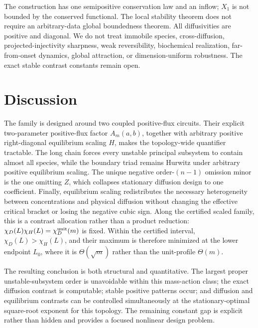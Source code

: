 \documentclass[11pt]{article}
\theoremstyle{definition}
\newcommand{\1}{\mathbf 1}
\begin{document}
The construction has one semipositive conservation law and an inflow; $X_1$
is not bounded by the conserved functional.  The local stability theorem does
not require an arbitrary-data global boundedness theorem.  All diffusivities
are positive and diagonal.  We do not treat immobile species, cross-diffusion,
projected-injectivity sharpness, weak reversibility, biochemical realization,
far-from-onset dynamics, global attraction, or dimension-uniform robustness.
The exact stable contrast constants remain open.

\section{Discussion}

The family is designed around two coupled positive-flux circuits.  Their
explicit two-parameter positive-flux factor $A_m(a,b)$, together with
arbitrary positive right-diagonal equilibrium scaling $H$, makes the
topology-wide quantifier tractable.  The long chain forces every unstable
principal subsystem to contain almost all species, while the boundary triad remains Hurwitz under
arbitrary positive equilibrium scaling.  The unique negative order-$(n-1)$
omission minor is the one omitting $Z$, which collapses stationary diffusion
design to one coefficient.  Finally, equilibrium scaling redistributes the
necessary heterogeneity between concentrations and physical diffusion without
changing the effective critical bracket or losing the negative cubic sign.
Along the certified scaled family, this is a contrast allocation rather than
a product reduction: $\chi_D(L)\chi_H(L)=\chi_D^{\rm unit}(m)$ is fixed.
Within the certified interval, $\chi_D(L)>\chi_H(L)$, and their maximum is
therefore minimized at the lower endpoint $L_0$, where it is
$\Theta(\sqrt m)$ rather than the unit-profile $\Theta(m)$.

The resulting conclusion is both structural and quantitative.  The largest
proper unstable-subsystem order is unavoidable within this mass-action class;
the exact diffusion contrast is computable; stable positive patterns occur;
and diffusion and equilibrium contrasts can be controlled simultaneously at
the stationary-optimal square-root exponent for this topology.  The remaining
constant gap is explicit rather than
hidden and provides a focused nonlinear design problem.
\end{document}
